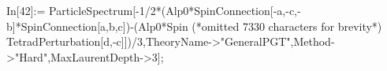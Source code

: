 In[42]:= ParticleSpectrum[-1/2*(Alp0*SpinConnection[-a,-c,-b]*SpinConnection[a,b,c])-(Alp0*Spin (*omitted 7330 characters for brevity*) TetradPerturbation[d,-c]])/3,TheoryName->"GeneralPGT",Method->"Hard",MaxLaurentDepth->3];